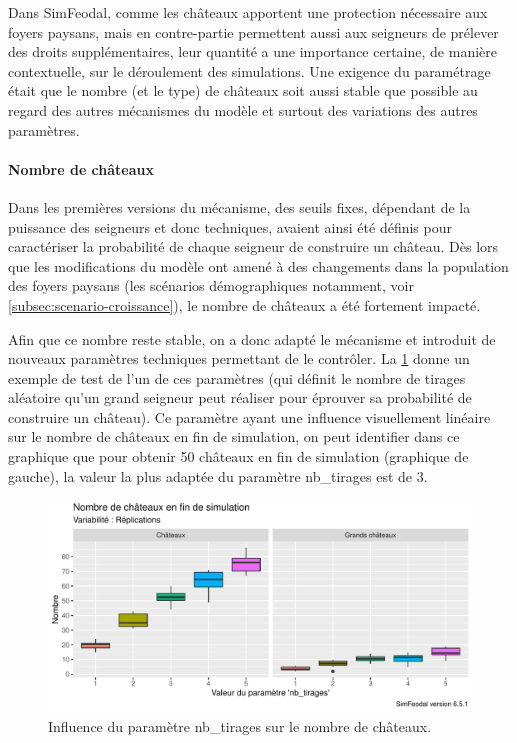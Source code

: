 Dans SimFeodal, comme les châteaux apportent une protection nécessaire aux foyers paysans, mais en contre-partie permettent aussi aux seigneurs de prélever des droits supplémentaires, leur quantité a une importance certaine, de manière contextuelle, sur le déroulement des simulations.
Une exigence du paramétrage était que le nombre (et le type) de châteaux soit aussi stable que possible au regard des autres mécanismes du modèle et surtout des variations des autres paramètres.

\paragraph{Nombre de châteaux}

Dans les premières versions du mécanisme, des seuils fixes, dépendant de la puissance des seigneurs et donc techniques, avaient ainsi été définis pour caractériser la probabilité de chaque seigneur de construire un château.
Dès lors que les modifications du modèle ont amené à des changements dans la population des foyers paysans (les scénarios démographiques notamment, voir \cref{subsec:scenario-croissance}), le nombre de châteaux a été fortement impacté.

Afin que ce nombre reste stable, on a donc adapté le mécanisme et introduit de nouveaux paramètres techniques permettant de le contrôler.
La \cref{fig:calibrage-param-chateaux} donne un exemple de test de l'un de ces paramètres (qui définit le nombre de tirages aléatoire qu'un grand seigneur peut réaliser pour éprouver sa probabilité de construire un château).
Ce paramètre ayant une influence visuellement linéaire sur le nombre de châteaux en fin de simulation, on peut identifier dans ce graphique que pour obtenir 50 châteaux en fin de simulation (graphique de gauche), la valeur la plus adaptée du paramètre \textsf{nb\_tirages} est de 3.

\begin{figure}[H]
	\centering
	\includegraphics[width=\linewidth]{img/calibrage_nombre_chateaux.pdf}
	\caption[Influence du paramètre \textsf{nb\_tirages} sur le nombre de châteaux.]{Influence du paramètre \textsf{nb\_tirages} sur le nombre de châteaux\footnotemark.}
	\label{fig:calibrage-param-chateaux}
\end{figure}


